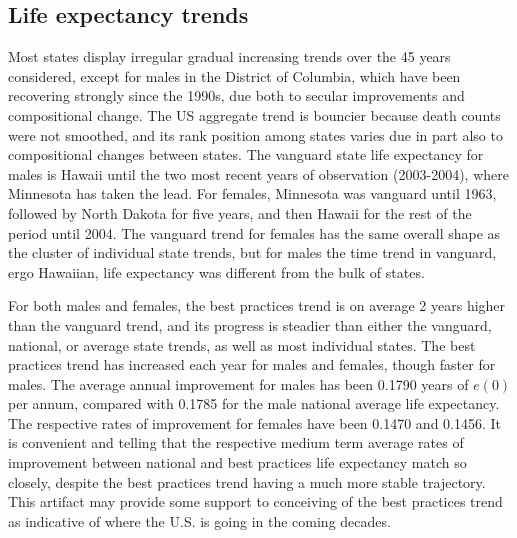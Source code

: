 \documentclass[11pt,oneside,a4paper]{article} %
\begin{document}
\subsection*{Life expectancy trends}
Most states display irregular gradual increasing trends
over the 45 years considered, except for males in the District of Columbia,
which have been recovering strongly since the 1990s, due both to secular
improvements and compositional change. The US aggregate trend is bouncier
because death counts were not smoothed, and its rank position among states
varies due in part also to compositional changes between states. The vanguard
state life expectancy for males is Hawaii until the two most recent years of
observation (2003-2004), where Minnesota has taken the lead. For females,
Minnesota was vanguard until 1963, followed by North Dakota for five years, and
then Hawaii for the rest of the period until 2004. The vanguard trend for
females has the same overall shape as the cluster of individual state trends, but for males the time trend in vanguard, ergo Hawaiian, life expectancy was
different from the bulk of states. 

For both males and females, the best
practices trend is on average 2 years higher than the vanguard trend, and its
progress is steadier than either the vanguard, national, or average state
trends, as well as most individual states. The best practices trend has increased each year for
males and females, though faster for males. The average annual improvement for
males has been 0.1790 years of $e(0)$ per annum, compared with 0.1785 for the
male national average life expectancy. The respective rates of improvement for
females have been 0.1470 and 0.1456. It is convenient and telling that the
respective medium term average rates of improvement between national and
best practices life expectancy match so closely, despite the best practices
trend having a much more stable trajectory. This artifact may provide some
support to conceiving of the best practices trend as indicative of where the
U.S. is going in the coming decades.
\end{document}
